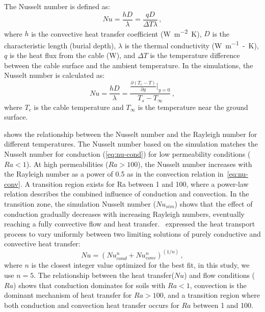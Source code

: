 \documentclass[Journal,letterpaper,InsideFigs]{ascelike-new}
\begin{document}
The Nusselt number is defined as: 
\begin{equation}
Nu = \frac{hD}{\lambda}  = \frac{qD}{\Delta T \lambda}\,,
\end{equation}
where $h$ is the convective heat transfer coefficient (\si{\watt\per\meter\squared\kelvin}), $D$ is the characteristic length (burial depth), $\lambda$ is the thermal conductivity (\si{\watt\per\meter-\kelvin}), $q$ is the heat flux from the cable (\si{\watt}), and $\Delta T$ is the temperature difference between the cable surface and the ambient temperature. In the simulations, the Nusselt number is calculated as: 
\begin{equation}
Nu = \frac{hD}{\lambda} =  \frac{\frac{\partial (T_c - T)}{\partial y}|_{y=0}}{T_s -T_\infty}\,,
\end{equation}
where $T_c$ is the cable temperature and $T_\infty$ is the temperature near the ground surface. 

 shows the relationship between the Nusselt number and the Rayleigh number for different temperatures. The Nusselt number based on the simulation matches the Nusselt number for conduction (\cref{eq:nu-cond}) for low permeability conditions ($Ra < 1$). At high permeabilities ($Ra > 100$), the Nusselt number increases with the Rayleigh number as a power of 0.5 as in the convection relation in~\cref{eq:nu-conv}. A transition region exists for Ra between 1 and 100, where a power-law relation describes the combined influence of conduction and convection. In the transition zone, the simulation Nusselt number ($Nu_{sim}$) shows that the effect of conduction gradually decreases with increasing Rayleigh numbers, eventually reaching a fully convective flow and heat transfer.~ expressed the heat transport process to vary uniformly between two limiting solutions of purely conductive and convective heat transfer:
\begin{equation}
    Nu = (Nu_{cond}^n + Nu_{conv}^n)^{(1/n)} \,,
\end{equation}
where $n$ is the closest integer value optimized for the best fit, in this study, we use $n = 5$.  The relationship between the heat transfer($Nu$) and flow conditions ($Ra$) shows that conduction dominates for soils with $Ra < 1$, convection is the dominant mechanism of heat transfer for $Ra > 100$, and a transition region where both conduction and convection heat transfer occurs for $Ra$ between 1 and 100.
\end{document}
